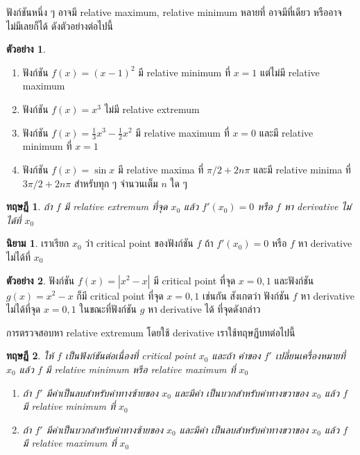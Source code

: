 \documentclass[
]{book}
\newtheorem{theorem}{ทฤษฎี}[chapter]
\theoremstyle{definition}
\newtheorem{definition}{นิยาม}[chapter]
\theoremstyle{definition}
\newtheorem{example}{ตัวอย่าง}[chapter]
\theoremstyle{definition}
\theoremstyle{definition}
\theoremstyle{remark}
\begin{document}
ฟังก์ชันหนึ่ง ๆ อาจมี relative maximum, relative minimum หลายที่ อาจมีที่เดียว
หรืออาจไม่มีเลยก็ได้ ดังตัวอย่างต่อไปนี้

\begin{example}
\leavevmode

\begin{enumerate}
\def\labelenumi{\arabic{enumi}.}
\item
  ฟังก์ชัน \(f(x) = (x-1)^2\) มี relative minimum ที่ \(x=1\) แต่ไม่มี relative
  maximum
\item
  ฟังก์ชัน \(f(x) = x^3\) ไม่มี relative extremum
\item
  ฟังก์ชัน \(f(x) = \frac{1}{3}x^3 - \frac{1}{2}x^2\) มี relative maximum ที่
  \(x=0\) และมี relative minimum ที่ \(x=1\)
\item
  ฟังก์ชัน \(f(x) = \sin x\) มี relative maxima ที่ \(\pi/2 + 2n\pi\) และมี
  relative minima ที่ \(3\pi/2 + 2n\pi\) สำหรับทุก ๆ จำนวนเต็ม \(n\) ใด ๆ
\end{enumerate}

\end{example}

\begin{theorem}
ถ้า \(f\) มี relative extremum ที่จุด \(x_0\) แล้ว \(f'(x_0) = 0\) หรือ \(f\) หา
derivative ไม่ได้ที่ \(x_0\)
\end{theorem}

\begin{definition}
เราเรียก \(x_0\) ว่า critical point ของฟังก์ชัน \(f\) ถ้า \(f'(x_0) = 0\) หรือ \(f\) หา
derivative ไม่ได้ที่ \(x_0\)
\end{definition}

\begin{example}
ฟังก์ชัน \(f(x) = |x^2-x|\) มี critical point ที่จุด \(x=0,1\) และฟังก์ชัน \(g(x) =
x^2-x\) ก็มี critical point ที่จุด \(x=0,1\) เช่นกัน สังเกตว่า ฟังก์ชัน \(f\) หา
derivative ไม่ได้ที่จุด \(x=0,1\) ในขณะที่ฟังก์ชัน \(g\) หา derivative ได้ ที่จุดดังกล่าว
\end{example}

การตรวจสอบหา relative extremum โดยใช้ derivative เราใช้ทฤษฏีบทต่อไปนี้

\begin{theorem}

ให้ \(f\) เป็นฟังก์ชันต่อเนื่องที่ critical point \(x_0\) และถ้า ค่าของ \(f'\)
เปลี่ยนเครื่องหมายที่ \(x_0\) แล้ว \(f\) มี relative minimum หรือ relative maximum ที่
\(x_0\)

\begin{enumerate}
\def\labelenumi{\arabic{enumi}.}
\item
  ถ้า \(f'\) มีค่าเป็นลบสำหรับค่าทางซ้ายของ \(x_0\) และมีค่า เป็นบวกสำหรับค่าทางขวาของ
  \(x_0\) แล้ว \(f\) มี relative minimum ที่ \(x_0\)
\item
  ถ้า \(f'\) มีค่าเป็นบวกสำหรับค่าทางซ้ายของ \(x_0\) และมีค่า เป็นลบสำหรับค่าทางขวาของ
  \(x_0\) แล้ว \(f\) มี relative maximum ที่ \(x_0\)
\end{enumerate}

\end{theorem}
\end{document}
